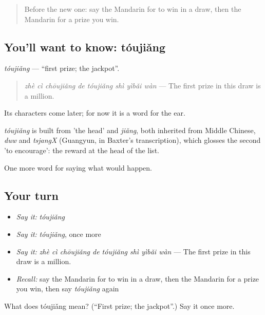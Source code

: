 \label{lesson:ZH-C530-toujiang}



\begin{quote}
Before the new one: say the Mandarin for to win in a draw, then the Mandarin for a prize you win.
\end{quote}

\subsection*{You'll want to know: tóujiǎng}
\emph{tóujiǎng} — \textquotedblleft{}first prize; the jackpot\textquotedblright{}.

\begin{quote}
\emph{zhè cì chōujiǎng de tóujiǎng shì yìbǎi wàn} — The first prize in this draw is a million.
\end{quote}

Its characters come later; for now it is a word for the ear.

\begin{cousinweb}
\emph{tóujiǎng} is built from  'the head' and \emph{jiǎng}, both inherited from Middle Chinese, \emph{duw} and \emph{tsjangX} (Guangyun, in Baxter's transcription), which glosses the second 'to encourage': the reward at the head of the list.
\end{cousinweb}

\begin{grammarlens}[title={What you've built}]
One more word for saying what would happen.
\end{grammarlens}

\subsection*{Your turn}
\begin{itemize}
\raggedright
  \item \emph{Say it:} \emph{tóujiǎng}
  \item \emph{Say it:} \emph{tóujiǎng}, once more
  \item \emph{Say it:} \emph{zhè cì chōujiǎng de tóujiǎng shì yìbǎi wàn} — The first prize in this draw is a million.
  \item \emph{Recall:} say the Mandarin for to win in a draw, then the Mandarin for a prize you win, then say \emph{tóujiǎng} again
\end{itemize}

\begin{tcolorbox}[breakable,colback=teal!4,colframe=teal!35!black,title={Before you move on}]
What does tóujiǎng mean? (\textquotedblleft{}First prize; the jackpot\textquotedblright{}.) Say it once more.
\end{tcolorbox}
